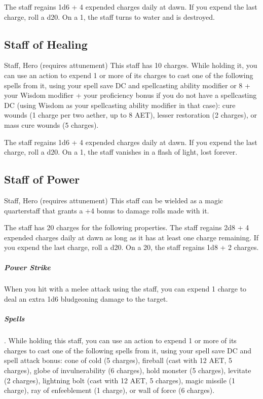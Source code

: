 The staff regains 1d6 + 4 expended charges daily at dawn. If you expend the last charge, roll a d20. On a 1, the staff turns to water and is destroyed.

\subsection{Staff of Healing}
Staff, Hero (requires attunement)
This staff has 10 charges. While holding it, you can use an action to expend 1 or more of its charges to cast one of the following spells from it, using your spell save DC and spellcasting ability modifier or 8 + your Wisdom modifier + your proficiency bonus if you do not have a spellcasting DC (using Wisdom as your spellcasting ability modifier in that case): cure wounds (1 charge per two aether, up to 8 AET), lesser restoration (2 charges), or mass cure wounds (5 charges).

The staff regains 1d6 + 4 expended charges daily at dawn. If you expend the last charge, roll a d20. On a 1, the staff vanishes in a flash of light, lost forever.

\subsection{Staff of Power}
Staff, Hero (requires attunement)
This staff can be wielded as a magic quarterstaff that grants a +4 bonus to damage rolls made with it.

The staff has 20 charges for the following properties. The staff regains 2d8 + 4 expended charges daily at dawn as long as it has at least one charge remaining. If you expend the last charge, roll a d20. On a 20, the staff regains 1d8 + 2 charges.

\subparagraph*{Power Strike} When you hit with a melee attack using the staff, you can expend 1 charge to deal an extra 1d6 bludgeoning damage to the target.

\subparagraph*{Spells}. While holding this staff, you can use an action to expend 1 or more of its charges to cast one of the following spells from it, using your spell save DC and spell attack bonus: cone of cold (5 charges), fireball (cast with 12 AET, 5 charges), globe of invulnerability (6 charges), hold monster (5 charges), levitate (2 charges), lightning bolt (cast with 12 AET, 5 charges), magic missile (1 charge), ray of enfeeblement (1 charge), or wall of force (6 charges).

